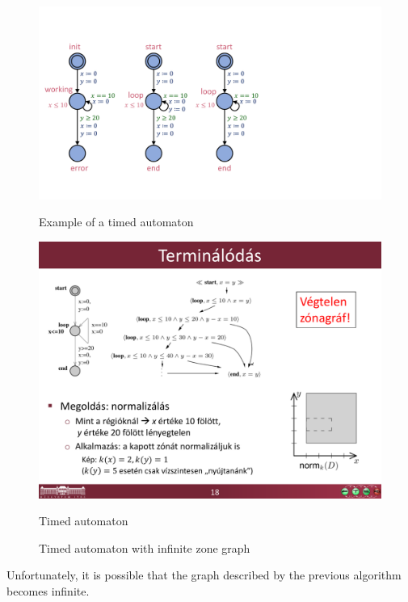 \begin{figure} [b]
	\centering
	\begin{minipage}[c] {0.25\linewidth}%
				\vspace*{1pt}%
		\includegraphics [width=\textwidth]{include/figures/loop_example_original}%
		\caption{Example of a timed automaton}
	\end{minipage}%
	\begin{minipage}[c] {0.7\linewidth}%
		\includegraphics [width=\textwidth] {include/figures/loop_original_zonegraph}%
				\vspace*{4pt}%
				\caption{Timed automaton}
	\end{minipage}
	\caption{Timed automaton with infinite zone graph}
	\label{fig:loopinfinite}
\end{figure} 

Unfortunately, it is possible that the graph described by the previous algorithm becomes infinite. 

